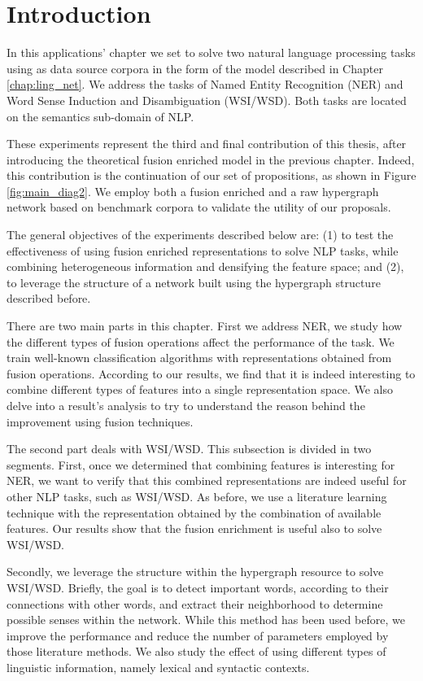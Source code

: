 \minitoc
\section{Introduction}
In this applications' chapter we set to solve two natural language processing tasks using as data source corpora in the form of the model described in Chapter \ref{chap:ling_net}. We address the tasks of Named Entity Recognition (NER) and Word Sense Induction and Disambiguation (WSI/WSD). Both tasks are located on the  semantics sub-domain of NLP. 

These experiments represent the third and final contribution of this thesis, after introducing the theoretical fusion enriched model in the previous chapter. Indeed, this contribution is the continuation of our set of propositions, as shown in Figure \ref{fig:main_diag2}. We employ both a fusion enriched and a raw hypergraph network based on benchmark corpora to validate the utility of our proposals.

The general objectives of the experiments described below are: (1) to test the effectiveness of using fusion enriched representations to solve NLP tasks, while combining heterogeneous information and densifying the feature space;  and (2), to leverage the structure of a network built using the hypergraph structure described before.

There are two main parts  in this chapter. First we address NER, we study how the different types of fusion operations affect the performance of the task. We train well-known classification algorithms with representations obtained from fusion operations.  According to our results, we find that it is indeed interesting to combine different types of features into a single representation space. We also delve into a result's analysis to try to understand the reason behind the improvement using fusion techniques.

The second part deals with WSI/WSD. This subsection is divided in two segments. First, once we determined that combining features is interesting for NER, we want to verify that this combined representations are indeed useful for other NLP tasks, such as WSI/WSD. As before, we use a literature learning technique with the representation obtained by the combination of available features. Our results show that the fusion enrichment is useful also to solve WSI/WSD.

Secondly, we leverage the structure within the hypergraph resource to solve WSI/WSD. Briefly, the goal is to detect important words, according to their connections with other words, and extract their neighborhood to determine possible senses  within the network. While this method has been used before, we improve the performance and reduce the number of parameters employed by those literature methods. We also study the effect of using different types of linguistic information, namely lexical and syntactic contexts.

